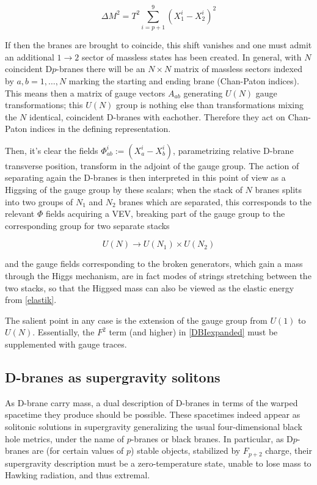 \begin{equation}
	\Delta M^2 = T^2 \sum_{i=p+1}^9 (X^i_1 - X^i_2)^2
	\label{elastik}
\end{equation}

If then the branes are brought to coincide, this shift vanishes and one must admit an additional $1\rightarrow2$ sector of massless states has been created. In general, with $N$ coincident D$p$-branes there will be an $N\times N$ matrix of massless sectors indexed by $a,b = 1,\ldots,N$ marking the starting and ending brane (Chan-Paton indices). This means then a matrix of gauge vectors $A_{ab}$ generating $U(N)$ gauge transformations; this $U(N)$ group is nothing else than transformations mixing the $N$ identical, coincident D-branes with eachother. Therefore they act on Chan-Paton indices in the defining representation.

Then, it's clear the fields $\Phi_{ab}^i := (X_a^i - X_b^i)$, parametrizing relative D-brane transverse position, transform in the adjoint of the gauge group. The action of separating again the D-branes is then interpreted in this point of view as a Higgsing of the gauge group by these scalars; when the stack of $N$ branes splits into two groups of $N_1$ and $N_2$ branes which are separated, this corresponds to the relevant $\Phi$ fields acquiring a VEV, breaking part of the gauge group to the corresponding group for two separate stacks

\begin{equation}
	U(N) \rightarrow U(N_1) \times U(N_2)
	\label{}
\end{equation}

and the gauge fields corresponding to the broken generators, which gain a mass through the Higgs mechanism, are in fact modes of strings stretching between the two stacks, so that the Higgsed mass can also be viewed as the elastic energy from \eqref{elastik}.


The salient point in any case is the extension of the gauge group from $U(1)$ to $U(N)$. Essentially, the $F^2$ term (and higher) in \eqref{DBIexpanded} must be supplemented with gauge traces.


\subsection{D-branes as supergravity solitons}

As D-brane carry mass, a dual description of D-branes in terms of the warped spacetime they produce should be possible. These spacetimes indeed appear as solitonic solutions in supergravity generalizing the usual four-dimensional black hole metrics, under the name of $p$-branes or black branes. In particular, as D$p$-branes are (for certain values of $p$) stable objects, stabilized by $F_{p+2}$ charge, their supergravity description must be a zero-temperature state, unable to lose mass to Hawking radiation, and thus extremal.

